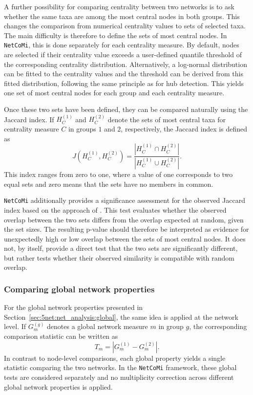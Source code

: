 A further possibility for comparing centrality between two networks is to ask whether the same taxa are among the most central nodes in both groups. This changes the comparison from numerical centrality values to sets of selected taxa. The main difficulty is therefore to define the sets of most central nodes. In \texttt{NetCoMi}, this is done separately for each centrality measure. By default, nodes are selected if their centrality value exceeds a user-defined quantile threshold of the corresponding centrality distribution. Alternatively, a log-normal distribution can be fitted to the centrality values and the threshold can be derived from this fitted distribution, following the same principle as for hub detection. This yields one set of most central nodes for each group and each centrality measure.

Once these two sets have been defined, they can be compared naturally using the Jaccard index. If $H_C^{(1)}$ and $H_C^{(2)}$ denote the sets of most central taxa for centrality measure $C$ in groups $1$ and $2$, respectively, the Jaccard index is defined as
\begin{equation}
\label{eq:5net:net_comparison:jaccard_index}
J\left(H_C^{(1)},H_C^{(2)}\right) =
\frac{\left|H_C^{(1)} \cap H_C^{(2)}\right|}
{\left|H_C^{(1)} \cup H_C^{(2)}\right|}.
\end{equation}
This index ranges from zero to one, where a value of one corresponds to two equal sets and zero means that the sets have no members in common.

\texttt{NetCoMi} additionally provides a significance assessment for the observed Jaccard index based on the approach of \citet{real1996probabilistic}. This test evaluates whether the observed overlap between the two sets differs from the overlap expected at random, given the set sizes. The resulting p-value should therefore be interpreted as evidence for unexpectedly high or low overlap between the sets of most central nodes. It does not, by itself, provide a direct test that the two sets are significantly different, but rather tests whether their observed similarity is compatible with random overlap.

\subsubsection*{Comparing global network properties}

For the global network properties presented in Section~\ref{sec:5net:net_analysis:global}, the same idea is applied at the network level. If $G_m^{(g)}$ denotes a global network measure $m$ in group $g$, the corresponding comparison statistic can be written as
\begin{equation}
\label{eq:5net:net_comparison:global_difference_statistic}
T_m = \left|G_m^{(1)} - G_m^{(2)}\right|.
\end{equation}
In contrast to node-level comparisons, each global property yields a single statistic comparing the two networks. In the \texttt{NetCoMi} framework, these global tests are considered separately and no multiplicity correction across different global network properties is applied. 

